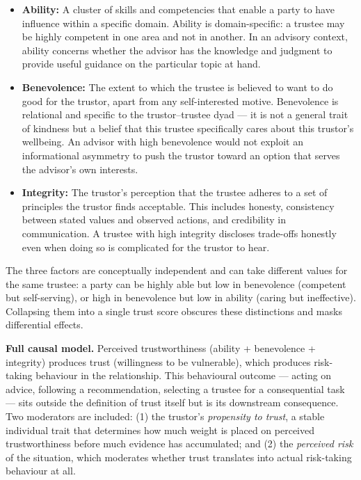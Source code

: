 \documentclass[11pt, a4paper]{article}
\begin{document}
\begin{itemize}
  \item \textbf{Ability:} A cluster of skills and competencies that enable a party to have influence within a specific domain. Ability is domain-specific: a trustee may be highly competent in one area and not in another. In an advisory context, ability concerns whether the advisor has the knowledge and judgment to provide useful guidance on the particular topic at hand.
  \item \textbf{Benevolence:} The extent to which the trustee is believed to want to do good for the trustor, apart from any self-interested motive. Benevolence is relational and specific to the trustor--trustee dyad --- it is not a general trait of kindness but a belief that this trustee specifically cares about this trustor's wellbeing. An advisor with high benevolence would not exploit an informational asymmetry to push the trustor toward an option that serves the advisor's own interests.
  \item \textbf{Integrity:} The trustor's perception that the trustee adheres to a set of principles the trustor finds acceptable. This includes honesty, consistency between stated values and observed actions, and credibility in communication. A trustee with high integrity discloses trade-offs honestly even when doing so is complicated for the trustor to hear.
\end{itemize}

The three factors are conceptually independent and can take different values for the same trustee: a party can be highly able but low in benevolence (competent but self-serving), or high in benevolence but low in ability (caring but ineffective). Collapsing them into a single trust score obscures these distinctions and masks differential effects.

\medskip
\noindent\textbf{Full causal model.} Perceived trustworthiness (ability + benevolence + integrity) produces trust (willingness to be vulnerable), which produces risk-taking behaviour in the relationship. This behavioural outcome --- acting on advice, following a recommendation, selecting a trustee for a consequential task --- sits outside the definition of trust itself but is its downstream consequence. Two moderators are included: (1) the trustor's \textit{propensity to trust}, a stable individual trait that determines how much weight is placed on perceived trustworthiness before much evidence has accumulated; and (2) the \textit{perceived risk} of the situation, which moderates whether trust translates into actual risk-taking behaviour at all.
\end{document}
